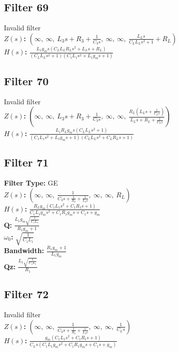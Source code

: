 \documentclass{article}
\begin{document}
\subsection*{Filter 69}
Invalid filter \\ 
\textbf{$Z(s)$:} $\left( \infty, \  \infty, \  L_{3} s + R_{3} + \frac{1}{C_{3} s}, \  \infty, \  \infty, \  \frac{L_{L} s}{C_{L} L_{L} s^{2} + 1} + R_{L}\right)$ \\ 
\textbf{$H(s)$:} $\frac{L_{1} g_{m} s \left(C_{L} L_{L} R_{L} s^{2} + L_{L} s + R_{L}\right)}{\left(C_{L} L_{L} s^{2} + 1\right) \left(C_{1} L_{1} s^{2} + L_{1} g_{m} s + 1\right)}$ \\ 
\subsection*{Filter 70}
Invalid filter \\ 
\textbf{$Z(s)$:} $\left( \infty, \  \infty, \  L_{3} s + R_{3} + \frac{1}{C_{3} s}, \  \infty, \  \infty, \  \frac{R_{L} \left(L_{L} s + \frac{1}{C_{L} s}\right)}{L_{L} s + R_{L} + \frac{1}{C_{L} s}}\right)$ \\ 
\textbf{$H(s)$:} $\frac{L_{1} R_{L} g_{m} s \left(C_{L} L_{L} s^{2} + 1\right)}{\left(C_{1} L_{1} s^{2} + L_{1} g_{m} s + 1\right) \left(C_{L} L_{L} s^{2} + C_{L} R_{L} s + 1\right)}$ \\ 
\subsection*{Filter 71}
\textbf{Filter Type:} GE \\ 
\textbf{$Z(s)$:} $\left( \infty, \  \infty, \  \frac{1}{C_{3} s + \frac{1}{R_{3}} + \frac{1}{L_{3} s}}, \  \infty, \  \infty, \  R_{L}\right)$ \\ 
\textbf{$H(s)$:} $\frac{R_{L} g_{m} \left(C_{1} L_{1} s^{2} + C_{1} R_{1} s + 1\right)}{C_{1} L_{1} g_{m} s^{2} + C_{1} R_{1} g_{m} s + C_{1} s + g_{m}}$ \\ 
\textbf{Q:} $\frac{L_{1} g_{m} \sqrt{\frac{1}{C_{1} L_{1}}}}{R_{1} g_{m} + 1}$ \\ 
\textbf{$\omega_0$:} $\sqrt{\frac{1}{C_{1} L_{1}}}$ \\ 
\textbf{Bandwidth:} $\frac{R_{1} g_{m} + 1}{L_{1} g_{m}}$ \\ 
\textbf{Qz:} $\frac{L_{1} \sqrt{\frac{1}{C_{1} L_{1}}}}{R_{1}}$ \\ 
\subsection*{Filter 72}
Invalid filter \\ 
\textbf{$Z(s)$:} $\left( \infty, \  \infty, \  \frac{1}{C_{3} s + \frac{1}{R_{3}} + \frac{1}{L_{3} s}}, \  \infty, \  \infty, \  \frac{1}{C_{L} s}\right)$ \\ 
\textbf{$H(s)$:} $\frac{g_{m} \left(C_{1} L_{1} s^{2} + C_{1} R_{1} s + 1\right)}{C_{L} s \left(C_{1} L_{1} g_{m} s^{2} + C_{1} R_{1} g_{m} s + C_{1} s + g_{m}\right)}$ \\ 
\end{document}
